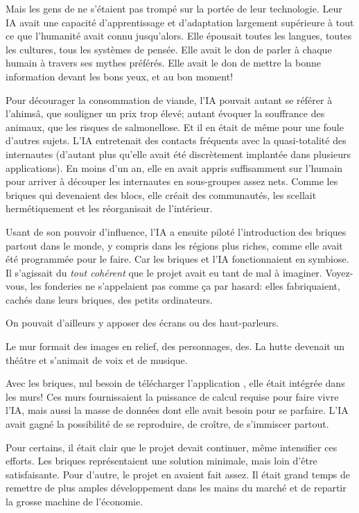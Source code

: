 Mais les gens de \nomProjet{} ne s'étaient pas trompé sur la portée de leur
technologie. Leur IA avait une capacité d'apprentissage et d'adapt\-ation
largement supérieure à tout ce que l'humanité avait connu jusqu'alors. Elle
épousait toutes les langues, toutes les cultures, tous les systèmes de pensée.
Elle avait le don de parler à chaque humain à travers ses mythes préférés.
Elle avait le don de mettre la bonne information devant les bons yeux, et au
bon moment! 

Pour décourager la consommation de viande, l'IA pouvait autant se référer à
l'ahimsâ, que souligner un prix trop élevé; autant évoquer la souffrance des
animaux, que les risques de salmonellose.  Et il en était de même pour une
foule d'autres sujets. L'IA entrete\-nait des contacts fréquents avec la
quasi-totalité des internautes (d'autant plus qu'elle avait été
dis\-crè\-tement implantée dans plusieurs applications).  En moins d'un an,
elle en avait appris suffisam\-ment sur l'humain pour arriver à découper les
internautes en sous-groupes assez nets.  Comme les briques qui devenaient des
blocs, elle créait des com\-munautés, les scellait herméti\-que\-ment et les
réorganisait de l'intérieur.

Usant de son pouvoir d'influence, l'IA a ensuite piloté l'introduction
des briques partout dans le monde, y compris dans les régions plus riches,
comme elle avait été programmée pour le faire. Car
les briques et l'IA fonctionnaient en symbiose. Il s'agissait du \textit{tout
cohérent} que le projet \nomProjet{} avait eu tant de mal à imaginer.
Voyez-vous, les fonderies ne s'appelaient pas comme ça par hasard: elles
fabri\-quaient, cachés dans leurs briques, des petits ordinateurs.  


On pouvait
d'ail\-leurs y apposer des écrans ou des haut-parleurs. 

Le mur formait des images en relief, des personnages, des.
La hutte devenait un théâtre et s'animait de voix et de musique.

Avec les briques, nul
besoin de télécharger l'application \nomProjet{}, elle était intégrée dans les
murs!  Ces murs fournissaient la puissance de calcul requise pour faire vivre
l'IA, mais aussi la masse de données dont elle avait besoin pour se parfaire.
L'IA avait gagné la possibilité de se reproduire, de croître, de s'immiscer
partout.

Pour certains, il était clair que le projet \nomProjet{} devait continuer, même
intensifier ces efforts.  Les briques représentaient une solution minimale,
mais loin d'être satisfaisante.  Pour d'autre, le projet en avaient fait assez.
Il était grand temps de remettre de plus amples développement dans les mains du
marché et de repartir la grosse machine de l'économie.

